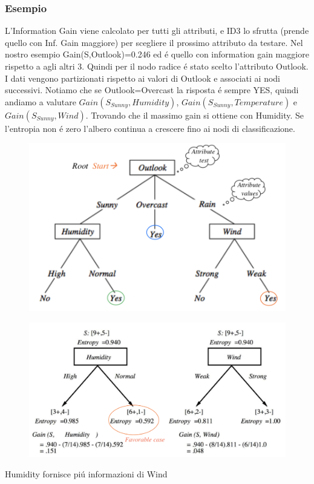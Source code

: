 \documentclass{article}
\begin{document}
\subsubsection{Esempio}
L'Information Gain viene calcolato per tutti gli attributi, e ID3 lo sfrutta (prende quello con Inf. Gain maggiore) per scegliere il prossimo attributo da testare. Nel nostro esempio Gain(S,Outlook)=0.246 ed é quello con information gain maggiore rispetto a agli altri 3. Quindi per il nodo radice é stato scelto l'attributo Outlook. I dati vengono partizionati rispetto ai valori di Outlook e associati ai nodi successivi. Notiamo che se Outlook=Overcast la risposta é sempre YES, quindi andiamo a valutare $Gain(S_{Sunny},Humidity)$, $Gain(S_{Sunny},Temperature)$ e $Gain(S_{Sunny},Wind)$. Trovando che il massimo gain si ottiene con Humidity. Se l'entropia non é zero l'albero continua a crescere fino ai nodi di classificazione.
\begin{figure}[H]
\centering
\includegraphics[scale=0.5]{Images/playtennisdecisiontree.png}
\end{figure}
\begin{figure}[H]
\centering
\includegraphics[scale=0.45]{Images/esempioentropia.png}
\end{figure}
Humidity fornisce piú informazioni di Wind
\end{document}
